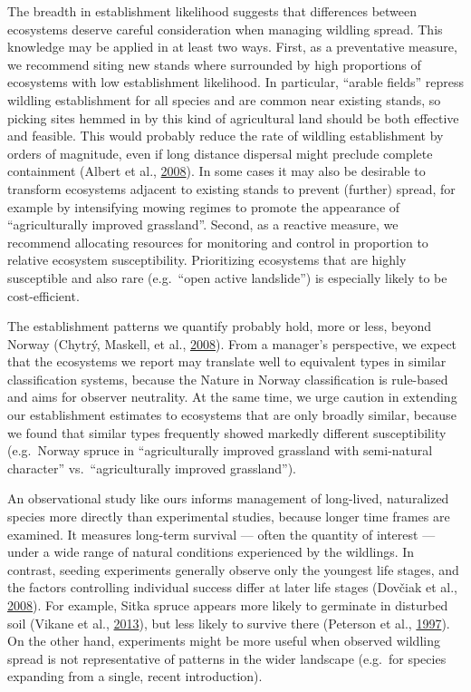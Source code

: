 \documentclass[
]{article}
\begin{document}
The breadth in establishment likelihood suggests that differences between ecosystems deserve careful consideration when managing wildling spread.
This knowledge may be applied in at least two ways.
First, as a preventative measure, we recommend siting new stands where surrounded by high proportions of ecosystems with low establishment likelihood.
In particular, ``arable fields'' repress wildling establishment for all species and are common near existing stands, so picking sites hemmed in by this kind of agricultural land should be both effective and feasible.
This would probably reduce the rate of wildling establishment by orders of magnitude, even if long distance dispersal might preclude complete containment (Albert et al., \protect\hyperlink{ref-albertLanduseChangeSubalpine2008}{2008}).
In some cases it may also be desirable to transform ecosystems adjacent to existing stands to prevent (further) spread, for example by intensifying mowing regimes to promote the appearance of ``agriculturally improved grassland''.
Second, as a reactive measure, we recommend allocating resources for monitoring and control in proportion to relative ecosystem susceptibility.
Prioritizing ecosystems that are highly susceptible and also rare (e.g.~``open active landslide'') is especially likely to be cost-efficient.

The establishment patterns we quantify probably hold, more or less, beyond Norway (Chytrý, Maskell, et al., \protect\hyperlink{ref-chytryHabitatInvasionsAlien2008}{2008}).
From a manager's perspective, we expect that the ecosystems we report may translate well to equivalent types in similar classification systems, because the Nature in Norway classification is rule-based and aims for observer neutrality.
At the same time, we urge caution in extending our establishment estimates to ecosystems that are only broadly similar, because we found that similar types frequently showed markedly different susceptibility (e.g.~Norway spruce in ``agriculturally improved grassland with semi-natural character'' vs.~``agriculturally improved grassland'').

An observational study like ours informs management of long-lived, naturalized species more directly than experimental studies, because longer time frames are examined.
It measures long-term survival --- often the quantity of interest --- under a wide range of natural conditions experienced by the wildlings.
In contrast, seeding experiments generally observe only the youngest life stages, and the factors controlling individual success differ at later life stages (Dovčiak et al., \protect\hyperlink{ref-dovciakSeedRainEnvironmental2008}{2008}).
For example, Sitka spruce appears more likely to germinate in disturbed soil (Vikane et al., \protect\hyperlink{ref-vikaneInvasionCallunaHeath2013}{2013}), but less likely to survive there (Peterson et al., \protect\hyperlink{ref-petersonEcologyManagementSitka1997}{1997}).
On the other hand, experiments might be more useful when observed wildling spread is not representative of patterns in the wider landscape (e.g.~for species expanding from a single, recent introduction).
\end{document}
